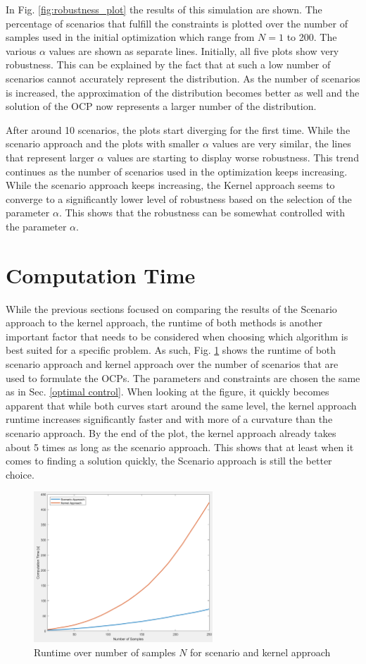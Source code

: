 In Fig. \ref{fig:robustness_plot} the results of this simulation are shown. The percentage of scenarios that fulfill the constraints is plotted over the number of samples used in the initial optimization which range from $N = 1$ to 200. The various $\alpha$ values are shown as separate lines. Initially, all five plots show very robustness. This can be explained by the fact that at such a low number of scenarios cannot accurately represent the distribution. As the number of scenarios is increased, the approximation of the distribution becomes better as well and the solution of the OCP now represents a larger number of the distribution. 

After around 10 scenarios, the plots start diverging for the first time. While the scenario approach and the plots with smaller $\alpha$ values are very similar, the lines that represent larger $\alpha$ values are starting to display worse robustness. This trend continues as the number of scenarios used in the optimization keeps increasing. While the scenario approach keeps increasing, the Kernel approach seems to converge to a significantly lower level of robustness based on the selection of the parameter $\alpha$. This shows that the robustness can be somewhat controlled with the parameter $\alpha$.

 

\section{Computation Time} \label{computation time}

While the previous sections focused on comparing the results of the Scenario approach to the kernel approach, the runtime of both methods is another important factor that needs to be considered when choosing which algorithm is best suited for a specific problem. As such, Fig. \ref{fig:runtime_plot} shows the runtime of both scenario approach and kernel approach over the number of scenarios that are used to formulate the OCPs. The parameters and constraints are chosen the same as in Sec. \ref{optimal control}. When looking at the figure, it quickly becomes apparent that while both curves start around the same level, the kernel approach runtime increases significantly faster and with more of a curvature than the scenario approach. By the end of the plot, the kernel approach already takes about 5 times as long as the scenario approach. This shows that at least when it comes to finding a solution quickly, the Scenario approach is still the better choice.

\begin{figure}[htb]
\centering
\includegraphics[width=0.6\textwidth]{pics/computationtime_plot.png}
\caption{Runtime over number of samples $N$ for scenario and kernel approach}
\label{fig:runtime_plot}
\end{figure}
